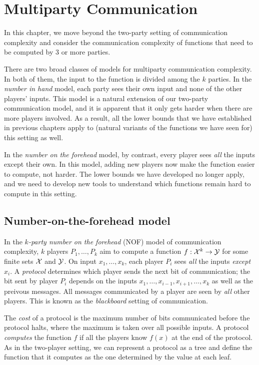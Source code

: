 \chapter[Multiparty Communication]{Multiparty Communication}

In this chapter, we move beyond the two-party setting of communication complexity and consider the communication complexity of functions that need to be computed by 3 or more parties.

There are two broad classes of models for multiparty communication complexity. In both of them, the input to the function is divided among the $k$ parties. In the \emph{number in hand} model, each party sees their own input and none of the other players' inputs. This model is a natural extension of our two-party communication model, and it is apparent that it only gets harder when there are more players involved. As a result, all the lower bounds that we have established in previous chapters apply to (natural variants of the functions we have seen for) this setting as well.

In the \emph{number on the forehead} model, by contrast, every player sees \emph{all} the inputs except their own. In this model, adding new players now make the function easier to compute, not harder. The lower bounds we have developed no longer apply, and we need to develop new tools to understand which functions remain hard to compute in this setting.


\newpage 
\section{Number-on-the-forehead model}

In the \emph{$k$-party number on the forehead} (NOF) model of communication complexity, $k$ players $P_1,\ldots,P_k$ aim to compute a function $f : \mathcal{X}^k \to \mathcal{Y}$ for some finite sets $\mathcal{X}$ and $\mathcal{Y}$. On input $x_1,\ldots,x_k$, each player $P_i$ sees \emph{all} the inputs \emph{except} $x_i$. A \emph{protocol} determines which player sends the next bit of communication; the bit sent by player $P_i$ depends on the inputs $x_1,\ldots,x_{i-1},x_{i+1},\ldots,x_k$ as well as the preivous messages. All messages communicated by a player are seen by \emph{all} other players. This is known as the \emph{blackboard} setting of communication.

The \emph{cost} of a protocol is the maximum number of bits communicated before the protocol halts, where the maximum is taken over all possible inputs. A protocol \emph{computes} the function $f$ if all the players know $f(x)$ at the end of the protocol. As in the two-player setting, we can represent a protocol as a tree and define the function that it computes as the one determined by the value at each leaf.

